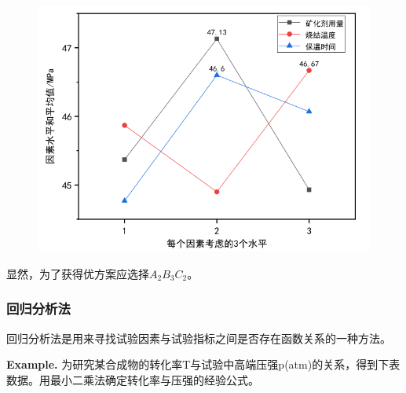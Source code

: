 \documentclass[UTF8]{ctexart}
\begin{document}
\begin{figure}[H]
\begin{center}
\includegraphics[height=16\baselineskip]{FIG/N1.png}
\end{center}
\end{figure}
\par 显然，为了获得优方案应选择$A_2$$B_3$$C_2$。

\setcounter{equation}{0}

\subsubsection{回归分析法}
\par 回归分析法是用来寻找试验因素与试验指标之间是否存在函数关系的一种方法。
\par \textbf{Example.} 为研究某合成物的转化率T与试验中高端压强p(atm)的关系，得到下表数据。用最小二乘法确定转化率与压强的经验公式。
\end{document}
